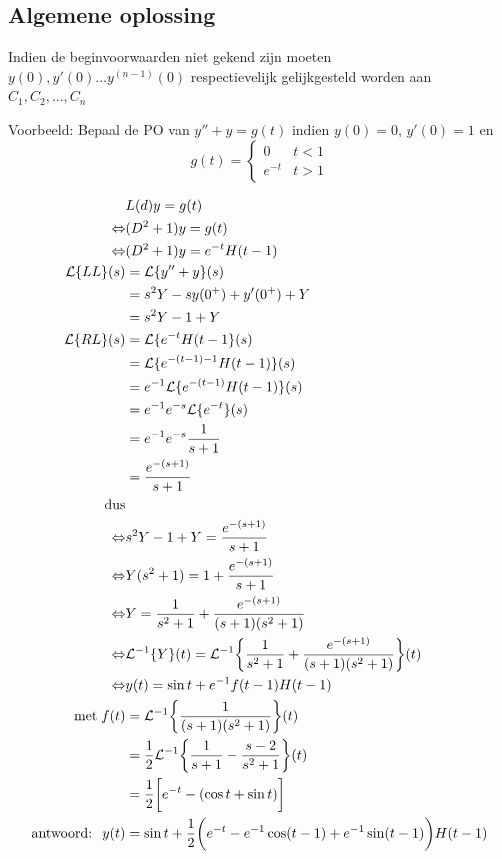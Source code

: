 \documentclass[12pt]{report}
\newcommand{\example}[2]{
    \hrulefill
    
    Voorbeeld: #1
    
    #2
    
    \hrulefill
}
\begin{document}
\subsection{Algemene oplossing}
Indien de beginvoorwaarden niet gekend zijn moeten $y(0),y'(0)...y^{(n-1)}(0)$ respectievelijk gelijkgesteld worden aan $C_1, C_2, ..., C_n$

\example{
  Bepaal de PO van $y'' + y = g(t)$ indien $y(0) = 0$, $y'(0) = 1$ en 
  $$
    g(t) = \begin{cases}
	      0 & t < 1 \\
	      e^{-t} & t > 1
	   \end{cases}
  $$
}{
  \begin{equation*}
   \begin{split}
                   & L(d)y = g(t) \\
   \Leftrightarrow & (D^2 + 1)y = g(t) \\
   \Leftrightarrow & (D^2 + 1)y = e^{-t}H(t - 1) \\
   \mathcal{L}\{LL\}(s) & = \mathcal{L}\{y'' + y\}(s) \\
                        & = s^2Y - sy(0^{+}) + y'(0^{+}) + Y \\
                        & = s^2Y - 1 + Y \\
   \mathcal{L}\{RL\}(s) & = \mathcal{L}\{e^{-t}H(t - 1\}(s) \\
                        & = \mathcal{L}\{e^{-(t - 1) - 1}H(t - 1)\}(s) \\
                        & = e^{-1}\mathcal{L}\{e^{-(t - 1)}H(t - 1)\}(s) \\
                        & = e^{-1}e^{-s}\mathcal{L}\{e^{-t}\}(s) \\
                        & = e^{-1}e^{-s}\frac{1}{s + 1} \\
                        & = \frac{e^{-(s + 1)}}{s + 1} \\
   \hbox{dus} \\
   \Leftrightarrow & s^2Y - 1 + Y = \frac{e^{-(s + 1)}}{s + 1} \\
   \Leftrightarrow & Y(s^2 + 1) = 1 + \frac{e^{-(s + 1)}}{s+1} \\
   \Leftrightarrow & Y = \frac{1}{s^2 + 1} + \frac{e^{-(s+1)}}{(s+1)(s^2+1)}     \\
   \Leftrightarrow & \mathcal{L}^{-1}\{Y\}(t) = \mathcal{L}^{-1}\bigg\{\frac{1}{s^2 + 1} + \frac{e^{-(s+1)}}{(s+1)(s^2+1)}\bigg\}(t) \\
   \Leftrightarrow & y(t) = \sin t +e^{-1}f(t - 1)H(t - 1) \\
	   \hbox{met}\; f(t) & = \mathcal{L}^{-1}\bigg\{\frac{1}{(s + 1)(s^2 + 1)}\bigg\}(t) \\
			     & = \frac{1}{2}\mathcal{L}^{-1}\bigg\{\frac{1}{s + 1} - \frac{s - 2}{s^2 + 1}\bigg\}(t) \\
			     & = \frac{1}{2}\bigg[e^{-t} - (\cos t + \sin t)\bigg] \\
	    \hbox{antwoord: }\; y(t)  & = \sin t + \frac{1}{2}\bigg(e^{-t} - e^{-1}\cos (t - 1) + e^{-1} \sin (t - 1) \bigg)H(t - 1)
   \end{split}
  \end{equation*}

}
\end{document}
